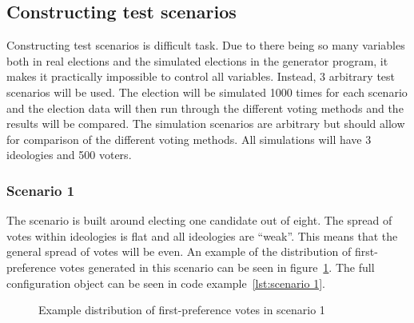 \documentclass[12pt]{article}
\begin{document}
\subsection{Constructing test scenarios}
Constructing test scenarios is difficult task. Due to there being so many variables both in real elections and the simulated elections in the generator program, it makes it practically impossible to control all variables. Instead, 3 arbitrary test scenarios will be used. The election will be simulated 1000 times for each scenario and the election data will then run through the different voting methods and the results will be compared. The simulation scenarios are arbitrary but should allow for comparison of the different voting methods. All simulations will have 3 ideologies and 500 voters.
\subsubsection{Scenario 1}
The scenario is built around electing one candidate out of eight. The spread of votes within ideologies is flat and all ideologies are ``weak''. This means that the general spread of votes will be even. An example of the distribution of first-preference votes generated in this scenario can be seen in figure~\ref{fig:example of scenario 1}. The full configuration object can be seen in code example~\ref{lst:scenario 1}.
\begin{figure}[H]
	\centering
	\caption{Example distribution of first-preference votes in scenario 1}
\label{fig:example of scenario 1}
\end{figure}
\end{document}
